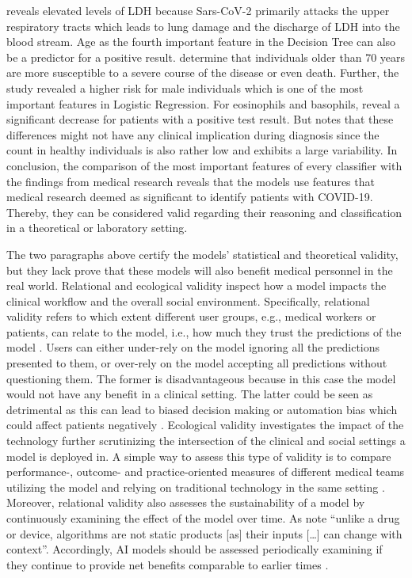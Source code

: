 reveals elevated levels of LDH because Sars-CoV-2 primarily attacks the upper 
respiratory tracts which leads to lung damage and the discharge of LDH into the 
blood stream. Age as the fourth important feature in the Decision Tree can also 
be a predictor for a positive result. \citeauthor{RN193} \cite{RN193} 
determine that individuals 
older than 70 years are more susceptible to a severe course of the disease or 
even death. Further, the study revealed a higher risk for male individuals 
which is one of the most important features in Logistic Regression.
For eosinophils and basophils, \cite{RN162, RN185} reveal a significant 
decrease for patients with a positive test result. But \cite{RN162} notes that 
these differences might not have any clinical implication during diagnosis since 
the count in healthy individuals is also rather low and exhibits a large 
variability.
In conclusion, the comparison of the most important features of every 
classifier with the findings from medical research reveals that the models use 
features that medical research deemed as significant to identify patients with 
COVID-19. Thereby, they can be considered valid regarding their reasoning and 
classification in a theoretical or laboratory setting.
\par
The two paragraphs above certify the models' statistical and theoretical 
validity, but they lack prove that these models will also benefit medical 
personnel in the real world. Relational and ecological validity inspect how a 
model impacts the clinical workflow and the overall social environment. 
Specifically, relational validity refers to which extent different user groups, 
e.g., medical workers or patients, can relate to the model, i.e., how much they 
trust the predictions of the model \cite{RN151}. Users can either under-rely on 
the model ignoring all the predictions presented to them, or over-rely on the 
model accepting all predictions without questioning them. The former is 
disadvantageous because in this case the model would not have any benefit in a 
clinical setting. The latter could be seen as detrimental as this can lead to 
biased decision making or automation bias which could affect patients 
negatively \cite{RN151, RN152}.
Ecological validity investigates the impact of the technology further 
scrutinizing the intersection of the clinical and social settings a model is 
deployed in. A simple way to assess this type of validity is to compare 
performance-, outcome- and practice-oriented measures of different medical 
teams utilizing the model and relying on traditional technology in the same 
setting \cite{RN152}. Moreover, relational validity also assesses the 
sustainability of a model by continuously examining the effect of the model 
over time. As \citeauthor{RN198} \cite{RN198} note ``unlike a drug or device, 
algorithms are not static products [as] their inputs […] can change with 
context''. Accordingly, AI models should be assessed periodically examining 
if they continue to provide net benefits comparable to earlier times 
\cite{RN152}.
